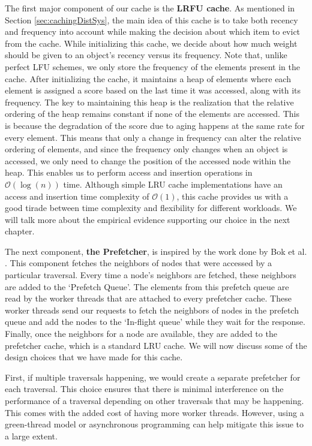 \medskip
The first major component of our cache is the \textbf{LRFU
cache}\cite{lee2001lrfu}. As mentioned in Section \ref{sec:cachingDistSys}, the
main idea of this cache is to take both recency and frequency into account while
making the decision about which item to evict from the cache. While initializing
this cache, we decide about how much weight should be given to an
object's recency versus its frequency. Note that, unlike perfect LFU schemes, we
only store the frequency of the elements present in the cache. After
initializing the cache, it maintains a heap of elements where each element is
assigned a score based on the last time it was accessed, along with its
frequency. The key to maintaining this heap is the realization that the relative
ordering of the heap remains constant if none of the elements are accessed. This
is because the degradation of the score due to aging happens at the same
rate for every element. This means that only a change in frequency can alter
the relative ordering of elements, and since the frequency only changes when an
object is accessed, we only need to change the position of the accessed node
within the heap. This enables us to perform access and insertion operations in
$\mathcal{O}(\log(n))$ time. Although simple LRU cache implementations have an
access and insertion time complexity of $\mathcal{O}(1)$,  this cache provides 
us with a good tirade between time complexity and flexibility for 
different workloads. We will talk more about the empirical evidence supporting
our choice in the next chapter.

\medskip
The next component, \textbf{the Prefetcher}, is inspired by the work done
by Bok et al. \cite{bok2020memory}. This component fetches the neighbors of
nodes that were accessed by a particular traversal. Every time a node's
neighbors are fetched, these neighbors are added to the `Prefetch Queue'. The
elements from this prefetch queue are read by the worker threads that are
attached to every prefetcher cache. These worker threads send our requests to
fetch the neighbors of nodes in the prefetch queue and add the nodes to the
`In-flight queue' while they wait for the response. Finally, once the neighbors
for a node are available, they are added to the prefetcher cache, which is a
standard LRU cache. We will now discuss some of the design choices that we have
made for this cache.

\medskip
First, if multiple traversals happening, we would create a separate
prefetcher for each traversal. This choice ensures that there is minimal
interference on the performance of a traversal depending on other traversals
that may be happening. This comes with the added cost of having more worker
threads. However, using a green-thread model or asynchronous programming can help
mitigate this issue to a large extent. 

